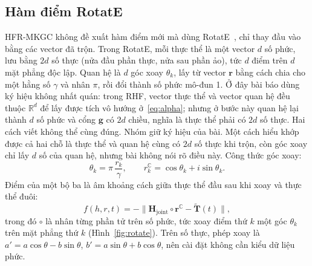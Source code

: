 \documentclass[conference,a4paper]{IEEEtran}
\newcommand{\Hj}{\mathbf{H}_{\mathrm{joint}}}
\newcommand{\Tt}{\tilde{\mathbf{T}}}
\begin{document}
\subsection{Hàm điểm RotatE}
\label{sec:hfr-rotate}

HFR-MKGC không đề xuất hàm điểm mới mà dùng RotatE~\cite{rotate}, chỉ thay đầu vào bằng các vector đã trộn. Trong RotatE, mỗi thực thể là một vector $d$ số phức, lưu bằng $2d$ số thực (nửa đầu phần thực, nửa sau phần ảo), tức $d$ điểm trên $d$ mặt phẳng độc lập. Quan hệ là $d$ góc xoay $\theta_k$, lấy từ vector $\mathbf{r}$ bằng cách chia cho một hằng số $\gamma$ và nhân $\pi$, rồi đổi thành số phức mô-đun 1. Ở đây bài báo dùng ký hiệu không nhất quán: trong RHF, vector thực thể và vector quan hệ đều thuộc $\mathbb{R}^d$ để lấy được tích vô hướng ở~\eqref{eq:alpha}; nhưng ở bước này quan hệ lại thành $d$ số phức và cổng $\mathbf{g}$ có $2d$ chiều, nghĩa là thực thể phải có $2d$ số thực. Hai cách viết không thể cùng đúng. Nhóm giữ ký hiệu của bài. Một cách hiểu khớp được cả hai chỗ là thực thể và quan hệ cùng có $2d$ số thực khi trộn, còn góc xoay chỉ lấy $d$ số của quan hệ, nhưng bài không nói rõ điều này. Công thức góc xoay:
\begin{equation}
\theta_k = \pi\,\frac{r_k}{\gamma}, \qquad r^{\mathbb{C}}_k = \cos\theta_k + i\sin\theta_k .
\end{equation}
Điểm của một bộ ba là âm khoảng cách giữa thực thể đầu sau khi xoay và thực thể đuôi:
\begin{equation}
f(h, r, t) = -\big\lVert \Hj \circ \mathbf{r}^{\mathbb{C}} - \Tt(t) \big\rVert ,
\label{eq:score}
\end{equation}
trong đó $\circ$ là nhân từng phần tử trên số phức, tức xoay điểm thứ $k$ một góc $\theta_k$ trên mặt phẳng thứ $k$ (Hình~\ref{fig:rotate}). Trên số thực, phép xoay là $a' = a\cos\theta - b\sin\theta$, $b' = a\sin\theta + b\cos\theta$, nên cài đặt không cần kiểu dữ liệu phức.
\end{document}
